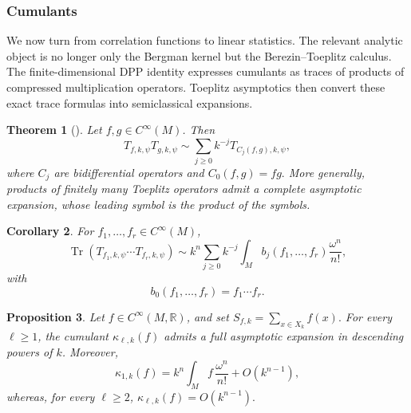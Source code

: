 \documentclass[12pt,a4paper,reqno]{article}
\theoremstyle{thmstyleone}
\newtheorem{theorem}{Theorem}[subsection]
\newtheorem{proposition}[theorem]{Proposition}
\newtheorem{corollary}[theorem]{Corollary}
\theoremstyle{thmstylethree}
\theoremstyle{thmstyletwo}
\numberwithin{equation}{subsection}
\def\geq{\geqslant}
\begin{document}
\subsubsection{Cumulants}

We now turn from correlation functions to linear statistics. The relevant analytic object is no longer only the Bergman kernel but the Berezin--Toeplitz calculus. The finite-dimensional DPP identity expresses cumulants as traces of products of compressed multiplication operators. Toeplitz asymptotics then convert these exact trace formulas into semiclassical expansions.

\begin{theorem}[\cite{MaMa2}]
\label{thm:MM-toeplitz-product}
Let $f,g\in C^\infty(M)$. Then
\[
    T_{f,k,\psi}T_{g,k,\psi}
    \sim
    \sum_{j\geq 0}k^{-j}T_{C_j(f,g),k,\psi},
\]
where $C_j$ are bidifferential operators and $C_0(f,g)=fg.$ More generally, products of finitely many Toeplitz operators admit a complete asymptotic expansion, whose leading symbol is the product of the symbols.
\end{theorem}

\begin{corollary}\label{cor:toeplitz-trace-asymp}
For $f_1,\ldots,f_r\in C^\infty(M)$,
\[
    \operatorname{Tr}(T_{f_1,k,\psi}\cdots T_{f_r,k,\psi})
    \sim
    k^n\sum_{j\geq 0}k^{-j}
    \int_M b_j(f_1,\ldots,f_r)\frac{\omega^n}{n!},
\]
with
\[
    b_0(f_1,\ldots,f_r)=f_1\cdots f_r.
\]
\end{corollary}

\begin{proposition}\label{prop:cumulant-asymptotics}
Let $f\in C^\infty(M,\mathbb R)$, and set $S_{f,k}=\sum_{x\in X_k}f(x).$ For every $\ell\geq 1$, the cumulant $\kappa_{\ell,k}(f)$ admits a full asymptotic expansion in descending powers of $k$. Moreover,
\[
    \kappa_{1,k}(f)
    =
    k^n\int_M f\,\frac{\omega^n}{n!}
    +O(k^{n-1}),
\]
whereas, for every $\ell\geq 2$, $\kappa_{\ell,k}(f)=O(k^{n-1}).$
\end{proposition}
\end{document}
